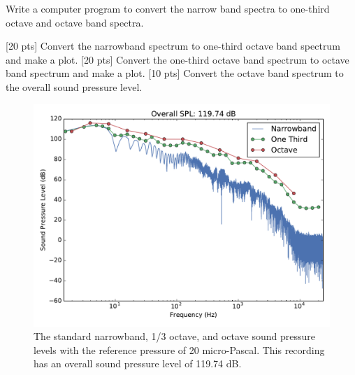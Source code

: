 \documentclass[onecolumn,10pt]{jhwhw}
\begin{document}
\clearpage
\problem{[50 Pts]} Write a computer program to convert the narrow band spectra to one-third octave and octave band spectra.

[20 pts] Convert the narrowband spectrum to one-third octave band spectrum and make a plot. [20 pts] Convert the one-third octave band spectrum to octave band spectrum and make a plot. [10 pts] Convert the octave band spectrum to the overall sound pressure level.
\solution

\begin{figure}[h]
  \centering
  \includegraphics[height=0.5\textheight]{figs/octaves.pdf}%
  \caption{The standard narrowband, 1/3 octave, and octave sound pressure levels with the reference pressure of 20 micro-Pascal. This recording has an overall sound pressure level of 119.74 dB.}%
\end{figure}
\end{document}
